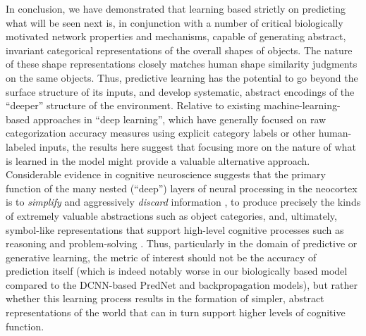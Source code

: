 \documentclass[11pt,twoside]{article}
\newif\myifpdf
\begin{document}
In conclusion, we have demonstrated that learning based strictly on predicting what will be seen next is, in conjunction with a number of critical biologically motivated network properties and mechanisms, capable of generating abstract, invariant categorical representations of the overall shapes of objects.  The nature of these shape representations closely matches human shape similarity judgments on the same objects.  Thus, predictive learning has the potential to go beyond the surface structure of its inputs, and develop systematic, abstract encodings of the ``deeper'' structure of the environment.  Relative to existing machine-learning-based approaches in ``deep learning'', which have generally focused on raw categorization accuracy measures using explicit category labels or other human-labeled inputs, the results here suggest that focusing more on the nature of what is learned in the model might provide a valuable alternative approach.  Considerable evidence in cognitive neuroscience suggests that the primary function of the many nested (``deep'') layers of neural processing in the neocortex is to \emph{simplify} and aggressively \emph{discard} information \cite{SimonsRensink05}, to produce precisely the kinds of extremely valuable abstractions such as object categories, and, ultimately, symbol-like representations that support high-level cognitive processes such as reasoning and problem-solving \cite{RougierNoelleBraverEtAl05,OReillyPetrovCohenEtAl14}.  Thus, particularly in the domain of predictive or generative learning, the metric of interest should not be the accuracy of prediction itself (which is indeed notably worse in our biologically based model compared to the DCNN-based PredNet and backpropagation models), but rather whether this learning process results in the formation of simpler, abstract representations of the world that can in turn support higher levels of cognitive function.


\end{document}

